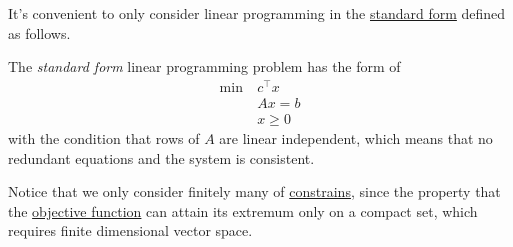 It's convenient to only consider linear programming in the \hyperref[def:standard-form]{standard form} defined as follows.

\begin{definition}\label{def:standard-form}
	The \emph{standard form} linear programming problem has the form of
	\begin{align*}
		\min~ & c^{\top}x \\
		      & Ax = b    \\
		      & x\geq 0
	\end{align*}
	with the condition that rows of \(A\) are linear independent, which means that no redundant equations  and the system is consistent.
\end{definition}

\begin{remark}
	Notice that we only consider finitely many of \hyperref[def:constraints]{constrains}, since the property that the \hyperref[def:objective-function]{objective function}
	can attain its extremum only on a compact set, which requires finite dimensional vector space.
\end{remark}

